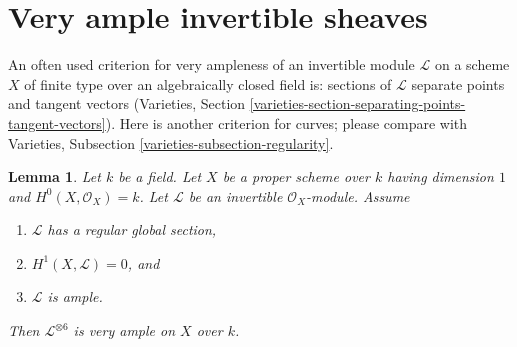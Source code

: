 \documentclass{stacks-project}
\theoremstyle{plain}
\newtheorem{lemma}[subsection]{Lemma}
\theoremstyle{definition}
\theoremstyle{remark}
\numberwithin{equation}{subsection}
\begin{document}
\section{Very ample invertible sheaves}
\label{section-very-ample}

\noindent
An often used criterion for very ampleness of an invertible module
$\mathcal{L}$ on a scheme $X$ of finite type over an algebraically
closed field is: sections of $\mathcal{L}$ separate points and
tangent vectors (Varieties, Section
\ref{varieties-section-separating-points-tangent-vectors}). Here is another
criterion for curves; please compare with
Varieties, Subsection \ref{varieties-subsection-regularity}.

\begin{lemma}
\label{lemma-criterion-very-ample}
Let $k$ be a field. Let $X$ be a proper scheme over $k$ having dimension $1$
and $H^0(X, \mathcal{O}_X) = k$. Let $\mathcal{L}$ be an invertible
$\mathcal{O}_X$-module. Assume
\begin{enumerate}
\item $\mathcal{L}$ has a regular global section,
\item $H^1(X, \mathcal{L}) = 0$, and
\item $\mathcal{L}$ is ample.
\end{enumerate}
Then $\mathcal{L}^{\otimes 6}$ is very ample on $X$ over $k$.
\end{lemma}
\end{document}
